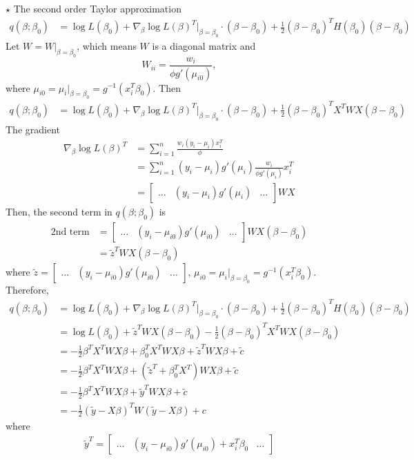 \documentclass[11pt]{article}
\newcommand{\jie}{$\star$ }
\newcommand{\half}{\frac{1}{2}}
\begin{document}
\begin{enumerate}[(A)]
\bigskip
\jie
The second order Taylor approximation
\begin{align*}
    q(\beta;\beta_0) &= \log L(\beta_0) + \nabla_\beta \log L(\beta)^T|_{\beta= \beta_0} \cdot (\beta - \beta_0) + \half (\beta - \beta_0)^T H(\beta_0) (\beta - \beta_0)
\end{align*}
Let $W = W|_{\beta = \beta_0}$, which means $W$ is a diagonal matrix and 
$$W_{ii} = \frac{w_i}{\phi g'(\mu_{i0})},$$
where $\mu_{i0} = \mu_i|_{\beta= \beta_0} = g^{-1}(x_i^T\beta_0)$. 
Then
\begin{align*}
    q(\beta;\beta_0) &= \log L(\beta_0) + \nabla_\beta \log L(\beta)^T|_{\beta= \beta_0} \cdot (\beta - \beta_0) + \half (\beta - \beta_0)^T X^T W X (\beta - \beta_0)
\end{align*}
The gradient
\begin{align*}
    \nabla_\beta \log L(\beta)^T &= \sum_{i=1}^n \frac{w_i(y_i - \mu_i) x_i^T}{ \phi} \\
    &=  \sum_{i=1}^n (y_i - \mu_i)g'(\mu_i) \frac{w_i }{ \phi g'(\mu_i)} x_i^T \\
    &= 
    \begin{bmatrix}
      \dots & (y_i - \mu_i)g'(\mu_i) & \dots
    \end{bmatrix}
    WX
\end{align*}
Then, the second term in $q(\beta;\beta_0)$ is 
\begin{align*}
    \text{2nd term} &= \begin{bmatrix}
      \dots & (y_i - \mu_{i0})g'(\mu_{i0}) & \dots
    \end{bmatrix}
    WX (\beta - \beta_0) \\
    &= \tilde{z}^T W X (\beta- \beta_0)
\end{align*}
where $\tilde{z} = \begin{bmatrix}
      \dots & (y_i - \mu_{i0})g'(\mu_{i0}) & \dots
    \end{bmatrix}$, $\mu_{i0} = \mu_i|_{\beta= \beta_0} = g^{-1}(x_i^T\beta_0)$. 
Therefore, 
\begin{align*}
    q(\beta;\beta_0) &= \log L(\beta_0) + \nabla_\beta \log L(\beta)^T|_{\beta= \beta_0} \cdot (\beta - \beta_0) + \half (\beta - \beta_0)^T H(\beta_0) (\beta - \beta_0) \\
    &=  \log L(\beta_0) + \tilde{z}^T W X (\beta- \beta_0) - \half (\beta - \beta_0)^T X^T W X (\beta - \beta_0) \\
    &= -\half \beta^T X^T W X \beta  + \beta_0^T X^T W X \beta + \tilde{z}^T W X \beta + \tilde{c} \\
    &= -\half \beta^T X^T W X \beta + (\tilde{z}^T + \beta_0^T X^T) W X\beta + \tilde{c} \\
    &= -\half \beta^T X^T W X \beta + \tilde{y}^T W X \beta + \tilde{c} \\
    &= -\frac{1}{2}(\tilde{y} - X \beta)^T W (\tilde{y} - X \beta) + c
\end{align*}
where 
\begin{align*}
    \tilde{y}^T = 
    \begin{bmatrix}
      \dots &  (y_i - \mu_{i0})g'(\mu_{i0}) + x_i^T \beta_0 & \dots
    \end{bmatrix}
\end{align*}



\end{enumerate}
\end{document}

